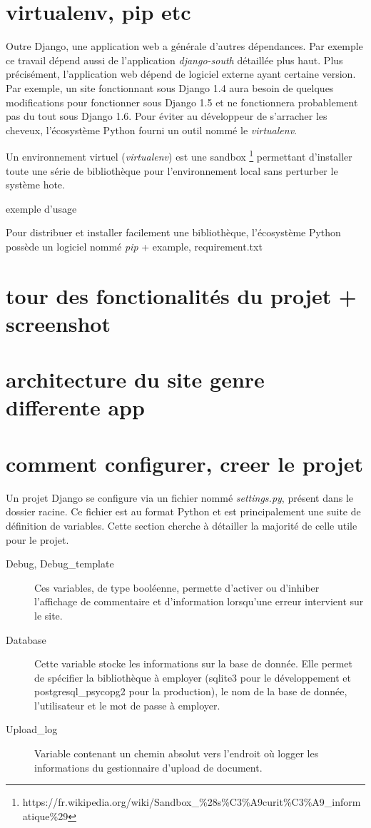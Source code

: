 \documentclass[a4paper,12pt]{article}
\begin{document}
\section{virtualenv, pip etc}

Outre Django, une application web a générale d'autres dépendances. Par exemple
ce travail dépend aussi de l'application \textit{django-south} détaillée plus haut.
Plus précisément, l'application web dépend de logiciel externe ayant certaine version.
Par exemple, un site fonctionnant sous Django 1.4 aura besoin de quelques modifications
pour fonctionner sous Django 1.5 et ne fonctionnera probablement pas du tout sous
Django 1.6. Pour éviter au développeur de s'arracher les cheveux, l'écosystème Python
fourni un outil nommé le \textit{virtualenv}.

Un environnement virtuel (\textit{virtualenv}) est une sandbox
\footnote{https://fr.wikipedia.org/wiki/Sandbox\_\%28s\%C3\%A9curit\%C3\%A9\_informatique\%29}
permettant d'installer toute une série de bibliothèque pour l'environnement
local sans perturber le système hote.

exemple d'usage

Pour distribuer et installer facilement une bibliothèque, l'écosystème Python
possède un logiciel nommé \textit{pip} + example, requirement.txt


\section{tour des fonctionalités du projet + screenshot}
\section{architecture du site genre differente app}
\section{comment configurer, creer le projet}

Un projet Django se configure via un fichier nommé \textit{settings.py},
présent dans le dossier racine. Ce fichier est au format Python et est principalement
une suite de définition de variables. Cette section cherche à détailler la majorité
de celle utile pour le projet.

\begin{description}
\item[Debug, Debug\_template] Ces variables, de type booléenne, permette d'activer
      ou d'inhiber l'affichage de commentaire et d'information lorsqu'une erreur
      intervient sur le site.
\item[Database] Cette variable stocke les informations sur la base de donnée. Elle
      permet de spécifier la bibliothèque à employer (sqlite3 pour le développement
      et postgresql\_psycopg2 pour la production), le nom de la base de donnée, l'utilisateur
      et le mot de passe à employer.
\item[Upload\_log] Variable contenant un chemin absolut vers l'endroit où logger
      les informations du gestionnaire d'upload de document.
\end{description}
\end{document}
